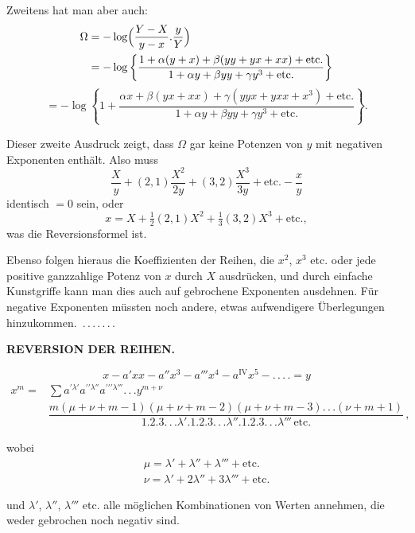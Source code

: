 \noindent\hspace*{\parindent}Zweitens hat man aber auch:
\[
\begin{aligned}\Omega &=-\log\Bigl(\dfrac{Y-X}{y-x} . \dfrac{y}{Y}\Bigr)\\ &=-\log\left\{\dfrac{1+\alpha(y+x)+\beta(yy+yx+xx)+\text{etc.}}{1+\alpha y+\beta yy+\gamma y^3+\text{etc.}}\right\}
\end{aligned}
\]
\[
=-\log\left\{1+\dfrac{\alpha x+\beta(yx+xx)+\gamma(yyx+yxx+x^3)+\text{etc.}}{1+\alpha y+\beta yy+\gamma y^3+\text{etc.}}\right\}.
\]

\noindent\hspace*{\parindent}Dieser zweite Ausdruck zeigt, dass $\Omega$ gar keine Potenzen von $y$ mit negativen Exponenten
enthält. Also muss
\[
\dfrac{X}{y}+(2,1)\dfrac{X^2}{2y}+(3,2)\dfrac{X^3}{3y}+\text{etc.}-\dfrac{x}{y}
\]
\noindent identisch $=0$ sein, oder
\[
x=X+\tfrac{1}{2}(2,1)X^2+\tfrac{1}{3}(3,2)X^3+\text{etc.},
\]
\noindent was die Reversionsformel ist.

Ebenso folgen hieraus die Koeffizienten der Reihen, die $x^2$, $x^3$ etc. oder jede positive ganzzahlige
Potenz von $x$ durch $X$ ausdrücken, und durch einfache Kunstgriffe kann man dies auch auf gebrochene
Exponenten ausdehnen. Für negative Exponenten müssten noch andere, etwas aufwendigere Überlegungen
\mbox{hinzukommen. .\,.\,.\,.\,.\,.\,.}



\begin{center}
\textbf{REVERSION DER REIHEN.}
\end{center}

\[
x-a'xx-a''x^3-a'''x^4-a^{\mathrm{IV}}x^5-.\,.\,.\,.=y
\]
\[
\begin{aligned}x^m={}&\sum a^{\prime\lambda'}a^{\prime\prime\lambda''}a^{\prime\prime\prime\lambda'''}.\,.\,. y^{m+\nu}\,\\
&\dfrac{m(\mu+\nu+m-1)(\mu+\nu+m-2)(\mu+\nu+m-3).\,.\,.(\nu+m+1)}
{1.2.3.\,.\,.\lambda'.1.2.3.\,.\,.\lambda''.1.2.3.\,.\,.\lambda'''\,\text{etc.}}\,,
\end{aligned}
\]

\noindent wobei
\[
\begin{array}{l}
\mu=\lambda'+\lambda''+\lambda'''+\text{etc.}\\[4pt]
\nu=\lambda'+2\lambda''+3\lambda'''+\text{etc.}
\end{array}
\]

\noindent und $\lambda'$, $\lambda''$, $\lambda'''$ etc. alle möglichen Kombinationen von Werten annehmen,
die weder gebrochen noch negativ sind.

